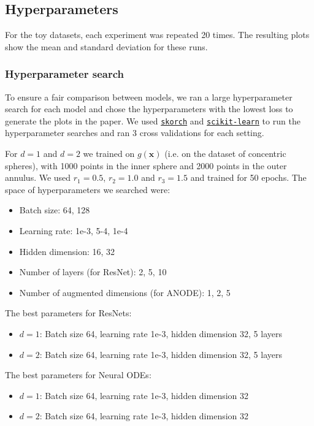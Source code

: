 \documentclass{article}
\begin{document}
\subsection{Hyperparameters}

For the toy datasets, each experiment was repeated 20 times. The resulting plots show the mean and standard deviation for these runs.

\subsubsection{Hyperparameter search}

To ensure a fair comparison between models, we ran a large hyperparameter search for each model and chose the hyperparameters with the lowest loss to generate the plots in the paper. We used \href{https://github.com/skorch-dev/skorch}{\texttt{skorch}} and \href{https://scikit-learn.org/stable/}{\texttt{scikit-learn}} \citep{pedregosa2011scikit} to run the hyperparameter searches and ran 3 cross validations for each setting.

For $d=1$ and $d=2$ we trained on $g(\mathbf{x})$ (i.e. on the dataset of concentric spheres), with 1000 points in the inner sphere and 2000 points in the outer annulus. We used $r_1=0.5$, $r_2=1.0$ and $r_3=1.5$ and trained for 50 epochs. The space of hyperparameters we searched were:

\begin{itemize}
    \item Batch size: 64, 128
    \item Learning rate: 1e-3, 5-4, 1e-4
    \item Hidden dimension: 16, 32 
    \item Number of layers (for ResNet): 2, 5, 10
    \item Number of augmented dimensions (for ANODE): 1, 2, 5
\end{itemize}

The best parameters for ResNets:

\begin{itemize}
    \item $d=1$: Batch size 64, learning rate 1e-3, hidden dimension 32, 5 layers
    \item $d=2$: Batch size 64, learning rate 1e-3, hidden dimension 32, 5 layers
\end{itemize}

The best parameters for Neural ODEs:

\begin{itemize}
    \item $d=1$: Batch size 64, learning rate 1e-3, hidden dimension 32
    \item $d=2$: Batch size 64, learning rate 1e-3, hidden dimension 32
\end{itemize}
\end{document}

